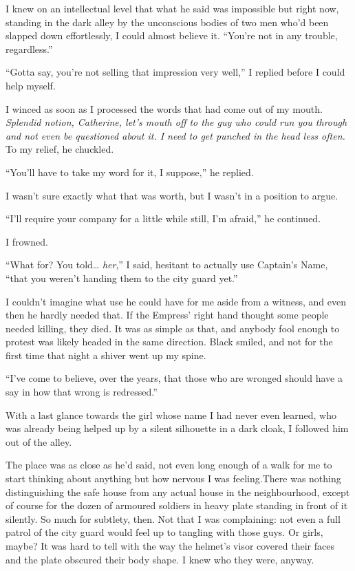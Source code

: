 \documentclass[12pt, openany]{book}
\begin{document}
I knew on an intellectual level that what he said was impossible but right now, standing in the dark alley by the unconscious bodies of two men who’d been slapped down effortlessly, I could almost believe it. “You’re not in any trouble, regardless.”

“Gotta say, you’re not selling that impression very well,” I replied before I could help myself.

I winced as soon as I processed the words that had come out of my mouth. \textit{Splendid notion, Catherine, let’s mouth off to the guy who could run you through and not even be questioned about it. I need to get punched in the head less often.} To my relief, he chuckled.

“You’ll have to take my word for it, I suppose,” he replied.

I wasn’t sure exactly what that was worth, but I wasn’t in a position to argue.

“I’ll require your company for a little while still, I’m afraid,” he continued.

I frowned.

“What for? You told… \textit{her},” I said, hesitant to actually use Captain’s Name, “that you weren’t handing them to the city guard yet.”

I couldn’t imagine what use he could have for me aside from a witness, and even then he hardly needed that. If the Empress’ right hand thought some people needed killing, they died. It was as simple as that, and anybody fool enough to protest was likely headed in the same direction. Black smiled, and not for the first time that night a shiver went up my spine.

“I’ve come to believe, over the years, that those who are wronged should have a say in how that wrong is redressed.”

With a last glance towards the girl whose name I had never even learned, who was already being helped up by a silent silhouette in a dark cloak, I followed him out of the alley.

The place was as close as he’d said, not even long enough of a walk for me to start thinking about anything but how nervous I was feeling.There was nothing distinguishing the safe house from any actual house in the neighbourhood, except of course for the dozen of armoured soldiers in heavy plate standing in front of it silently. So much for subtlety, then. Not that I was complaining: not even a full patrol of the city guard would feel up to tangling with those guys. Or girls, maybe? It was hard to tell with the way the helmet’s visor covered their faces and the plate obscured their body shape. I knew who they were, anyway. 
\end{document}

